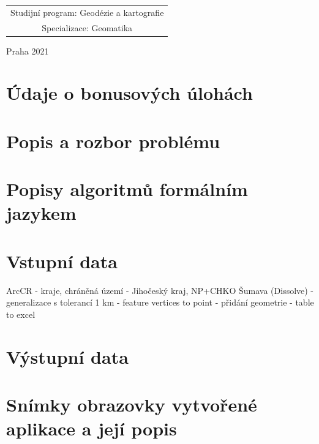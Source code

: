 \documentclass[a4paper, 12pt, oneside, titlepage]{article} %
\begin{document}
\begin{center}
\begin{tabular}{c}
Studijní program: Geodézie a kartografie \\
\noalign{\vspace{2mm}}

Specializace: Geomatika\\

\end{tabular}


\vfill

Praha 2021

\end{center}



\clearpage
\section{Údaje o bonusových úlohách}



\section{Popis a rozbor problému}



\section{Popisy algoritmů formálním jazykem} \label{popisalg}




\section{Vstupní data}
ArcCR - kraje, chráněná území - Jihočeský kraj, NP+CHKO Šumava (Dissolve) - generalizace s tolerancí 1 km - feature vertices to point - přidání geometrie - table to excel


\section{Výstupní data}



\section{Snímky obrazovky vytvořené aplikace a její popis}\label{snimky}
\end{document}
